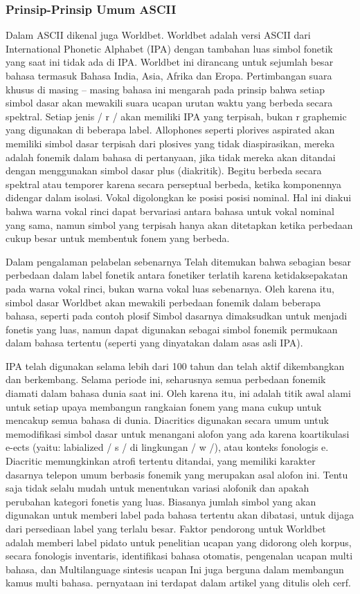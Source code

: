 		\subsubsection{Prinsip-Prinsip Umum ASCII}
 	Dalam ASCII dikenal juga Worldbet. Worldbet adalah versi ASCII dari  International Phonetic Alphabet (IPA) dengan tambahan luas simbol fonetik yang saat ini tidak ada di IPA. Worldbet ini dirancang untuk sejumlah besar bahasa termasuk Bahasa India, Asia, Afrika dan Eropa. Pertimbangan suara khusus di masing – masing bahasa ini mengarah pada prinsip bahwa setiap simbol dasar akan mewakili suara ucapan urutan waktu yang berbeda secara spektral. Setiap jenis / r / akan memiliki IPA yang terpisah, bukan r graphemic yang digunakan di beberapa label. Allophones seperti plorives aspirated akan memiliki simbol dasar terpisah dari plosives yang tidak diaspirasikan, mereka adalah fonemik dalam bahasa di pertanyaan, jika tidak mereka akan ditandai dengan menggunakan simbol dasar plus (diakritik). Begitu berbeda secara spektral atau temporer karena secara perseptual berbeda, ketika komponennya didengar dalam isolasi. Vokal digolongkan ke posisi posisi nominal. Hal ini diakui bahwa warna vokal rinci dapat bervariasi antara bahasa untuk vokal nominal yang sama, namun simbol yang terpisah hanya akan ditetapkan ketika perbedaan cukup besar untuk membentuk fonem yang berbeda.
 
 	Dalam pengalaman pelabelan sebenarnya Telah ditemukan bahwa sebagian besar perbedaan dalam label fonetik antara fonetiker terlatih karena ketidaksepakatan pada warna vokal rinci, bukan warna vokal luas sebenarnya. Oleh karena itu, simbol dasar Worldbet akan mewakili perbedaan fonemik dalam beberapa bahasa, seperti pada contoh plosif Simbol dasarnya dimaksudkan untuk menjadi fonetis yang luas, namun dapat digunakan sebagai simbol fonemik permukaan dalam bahasa tertentu (seperti yang dinyatakan dalam asas asli IPA).
 
 	IPA telah digunakan selama lebih dari 100 tahun dan telah aktif dikembangkan dan berkembang. Selama periode ini, seharusnya semua perbedaan fonemik diamati dalam bahasa dunia saat ini. Oleh karena itu, ini adalah titik awal alami untuk setiap upaya membangun rangkaian fonem yang mana cukup untuk mencakup semua bahasa di dunia.
 	Diacritics digunakan secara umum untuk memodifikasi simbol dasar untuk menangani alofon yang ada karena koartikulasi e-ects (yaitu: labialized / s / di lingkungan / w /), atau konteks fonologis e. Diacritic memungkinkan atrofi tertentu ditandai, yang memiliki karakter dasarnya telepon umum berbasis fonemik yang merupakan asal alofon ini. Tentu saja tidak selalu mudah untuk menentukan variasi alofonik dan apakah perubahan kategori fonetis yang luas. Biasanya jumlah simbol yang akan digunakan untuk memberi label pada bahasa tertentu akan dibatasi, untuk dijaga dari persediaan label yang terlalu besar. Faktor pendorong untuk Worldbet adalah memberi label pidato untuk penelitian ucapan yang didorong oleh korpus, secara fonologis inventaris, identifikasi bahasa otomatis, pengenalan ucapan multi bahasa, dan Multilanguage sintesis ucapan Ini juga berguna dalam membangun kamus multi bahasa. pernyataan ini terdapat dalam artikel yang ditulis oleh cerf. \cite{cerf1969ascii}


